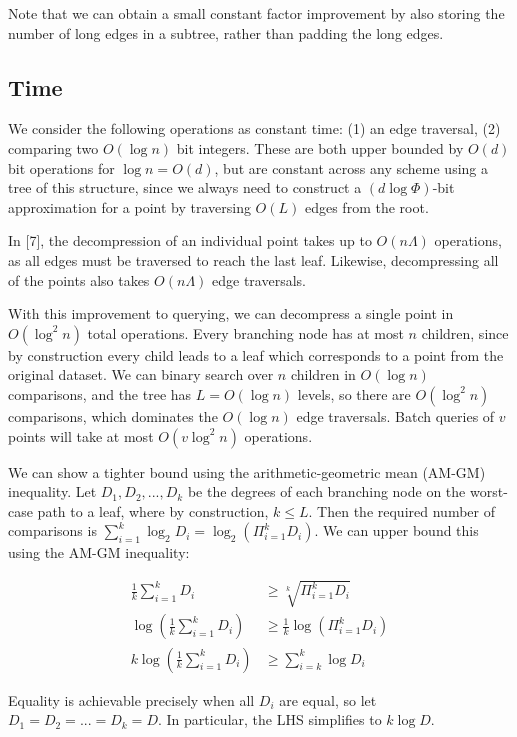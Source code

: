 \documentclass{article}
\begin{document}
Note that we can obtain a small constant factor improvement by also storing the
number of long edges in a subtree, rather than padding the long edges.

\subsection{Time}

We consider the following operations as constant time: (1) an edge traversal,
(2) comparing two $O(\log n)$ bit integers. These are both upper bounded by
$O(d)$ bit operations for $\log n = O(d)$, but are constant across any scheme
using a tree of this structure, since we always need to construct a $(d \log
\Phi)$-bit approximation for a point by traversing $O(L)$ edges from the root.

In [7], the decompression of an individual point takes up to $O(n\Lambda)$ operations,
as all edges must be traversed to reach the last leaf. Likewise, decompressing
all of the points also takes $O(n\Lambda)$ edge traversals.

With this improvement to querying, we can decompress a single point in $O(\log^2
n)$ total operations. Every branching node has at most $n$ children, since by
construction every child leads to a leaf which corresponds to a point from the
original dataset. We can binary search over $n$ children in $O(\log n)$
comparisons, and the tree has $L = O(\log n)$ levels, so there are $O(\log^2 n)$
comparisons, which dominates the $O(\log n)$ edge traversals. Batch queries of
$v$ points will take at most $O(v \log^2 n)$ operations.

We can show a tighter bound using the arithmetic-geometric mean (AM-GM)
inequality. Let $D_1,D_2,...,D_k$ be the degrees of each branching node on the
worst-case path to a leaf, where by construction, $k \leq L$. Then the required
number of comparisons is $\sum_{i=1}^k \log_2 D_i = \log_2(\Pi_{i=1}^k D_i)$. We can
upper bound this using the AM-GM inequality:

\begin{align}
  \frac{1}{k} \sum_{i=1}^k D_i &\geq \sqrt[k]{\Pi_{i=1}^k D_i} \\
  \log (\frac{1}{k} \sum_{i=1}^k D_i) &\geq \frac{1}{k} \log (\Pi_{i=1}^k D_i) \\
  k \log (\frac{1}{k} \sum_{i=1}^k D_i) &\geq \sum_{i=k}^k \log D_i
\end{align}

Equality is achievable precisely when all $D_i$ are equal, so let $D_1 = D_2 =
... = D_k = D$. In particular, the LHS simplifies to $k \log D$.
\end{document}
